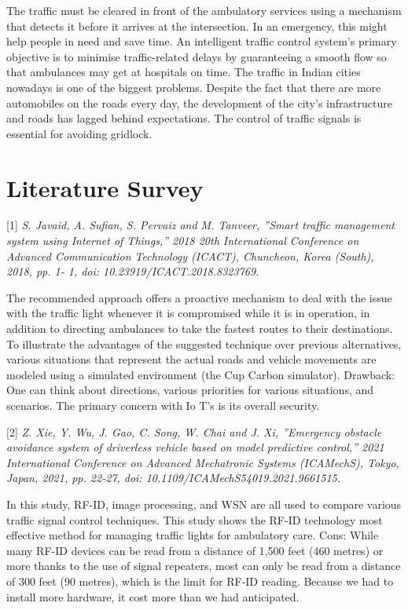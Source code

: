 \documentclass[conference]{IEEEtran}
\begin{document}
The traffic must be cleared in front of the ambulatory services using a mechanism that detects it before it arrives at the intersection. In an emergency, this might help people in need and save time. An intelligent traffic control system's primary objective is to minimise traffic-related delays by guaranteeing a smooth flow so that ambulances may get at hospitals on time. The traffic in Indian cities nowadays is one of the biggest problems. Despite the fact that there are more automobiles on the roads every day, the development of the city's infrastructure and roads has lagged behind expectations. The control of traffic signals is essential for avoiding gridlock.


\section{Literature Survey}
[1]\emph{ S. Javaid, A. Sufian, S. Pervaiz and M. Tanveer, ”Smart
traffic management system using Internet of Things,” 2018
20th International Conference on Advanced Communication
Technology (ICACT), Chuncheon, Korea (South), 2018, pp. 1-
1, doi: 10.23919/ICACT.2018.8323769. }

 The recommended approach offers a proactive mechanism to deal with the issue with the traffic light whenever it is compromised while it is in operation, in addition to directing ambulances to take the fastest routes to their destinations. To illustrate the advantages of the suggested technique over previous alternatives, various situations that represent the actual roads and vehicle movements are modeled using a simulated environment (the Cup Carbon simulator).
Drawback: One can think about directions, various priorities for various situations, and scenarios. The primary concern with  Io T's is its overall security.



[2]\emph{ Z. Xie, Y. Wu, J. Gao, C. Song, W. Chai and
J. Xi, ”Emergency obstacle avoidance system of driverless vehicle based on model predictive control,” 2021
International Conference on Advanced Mechatronic Systems (ICAMechS), Tokyo, Japan, 2021, pp. 22-27, doi:
10.1109/ICAMechS54019.2021.9661515. }

 In this study, RF-ID, image processing, and WSN are all used to compare various traffic signal control techniques. This study shows the RF-ID technology most effective method for managing traffic lights for ambulatory care.
Cons: While many RF-ID devices can be read from a distance of 1,500 feet (460 metres) or more thanks to the use of signal repeaters, most can only be read from a distance of 300 feet (90 metres), which is the limit for RF-ID reading. Because we had to install more hardware, it cost more than we had anticipated.
\end{document}

